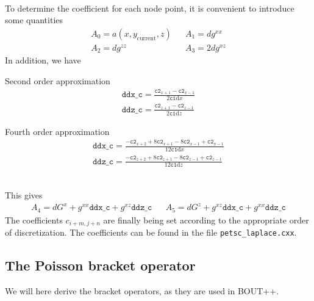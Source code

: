 \documentclass[12pt]{article}
\begin{document}
\\
To determine the coefficient for each node point, it is convenient to introduce
some quantities
%
\begin{align*}
    &A_0 = a(x,y_{\text{current}},z)&
    &A_1 = dg^{xx}&\\
    &A_2 = dg^{zz}&
    &A_3 = 2dg^{xz}&
\end{align*}
%
In addition, we have\\
%
\begin{minipage}{0.45\textwidth}
Second order approximation
\begin{align*}
    \texttt{ddx\_c} =
     \frac{\texttt{c2}_{x+1} - \texttt{c2}_{x-1}
      }{
      2\texttt{c1}\text{d}x}\\
    \texttt{ddz\_c} =
     \frac{\texttt{c2}_{z+1} - \texttt{c2}_{z-1}
      }{
      2\texttt{c1}\text{d}z}
\end{align*}
\end{minipage}
%
\hspace{1cm}
%
\begin{minipage}{0.45\textwidth}
Fourth order approximation
\begin{align*}
    \texttt{ddx\_c} =
     \frac{-\texttt{c2}_{x+2} + 8\texttt{c2}_{x+1} - 8\texttt{c2}_{x-1} + \texttt{c2}_{x-1}
      }{
      12\texttt{c1}\text{d}x}\\
    \texttt{ddz\_c} =
     \frac{-\texttt{c2}_{z+2} + 8\texttt{c2}_{z+1} - 8\texttt{c2}_{z-1} + \texttt{c2}_{z-1}
      }{
      12\texttt{c1}\text{d}z}
\end{align*}
\end{minipage}
\\
%
This gives
%
\begin{align*}
    &A_4 = dG^x + g^{xx}\texttt{ddx\_c} + g^{xz}\texttt{ddz\_c}&
    &A_5 = dG^z + g^{xz}\texttt{ddx\_c} + g^{xx}\texttt{ddz\_c}&
\end{align*}
%
The coefficients $c_{i+m,j+n}$ are finally being set according to the
appropriate order of discretization. The coefficients can be found in
the file \texttt{petsc\_laplace.cxx}.




\subsection{The Poisson bracket operator}
%
We will here derive the bracket operators, as they are used in BOUT++.
\end{document}
